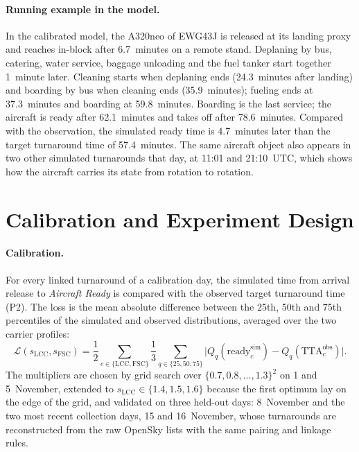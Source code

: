 \paragraph{Running example in the model.}
In the calibrated model, the A320neo of EWG43J is released at its landing proxy and reaches in-block after 6.7~minutes on a remote stand. Deplaning by bus, catering, water service, baggage unloading and the fuel tanker start together 1~minute later. Cleaning starts when deplaning ends (24.3~minutes after landing) and boarding by bus when cleaning ends (35.9~minutes); fueling ends at 37.3~minutes and boarding at 59.8~minutes. Boarding is the last service; the aircraft is ready after 62.1~minutes and takes off after 78.6~minutes. Compared with the observation, the simulated ready time is 4.7~minutes later than the target turnaround time of 57.4~minutes. The same aircraft object also appears in two other simulated turnarounds that day, at 11:01 and 21:10~UTC, which shows how the aircraft carries its state from rotation to rotation.

\section{Calibration and Experiment Design}
\label{sec:method-calibration}

\paragraph{Calibration.}
For every linked turnaround of a calibration day, the simulated time from arrival release to \emph{Aircraft Ready} is compared with the observed target turnaround time (P2). The loss is the mean absolute difference between the 25th, 50th and 75th percentiles of the simulated and observed distributions, averaged over the two carrier profiles:
\begin{equation}
\mathcal{L}(s_{\mathrm{LCC}},s_{\mathrm{FSC}})=\frac{1}{2}\sum_{c\in\{\mathrm{LCC},\mathrm{FSC}\}}\frac{1}{3}\sum_{q\in\{25,50,75\}}\bigl|Q_q(\mathrm{ready}^{\mathrm{sim}}_c)-Q_q(\mathrm{TTA}^{\mathrm{obs}}_c)\bigr|.
\label{eq:loss}
\end{equation}
The multipliers are chosen by grid search over $\{0.7,0.8,\ldots,1.3\}^2$ on 1 and 5~November, extended to $s_{\mathrm{LCC}}\in\{1.4,1.5,1.6\}$ because the first optimum lay on the edge of the grid, and validated on three held-out days: 8~November and the two most recent collection days, 15 and 16~November, whose turnarounds are reconstructed from the raw OpenSky lists with the same pairing and linkage rules.

